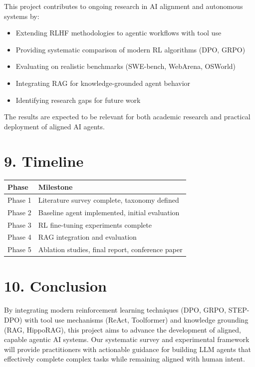 \documentclass[12pt,a4paper]{report}
\theoremstyle{definition}
\begin{document}
This project contributes to ongoing research in AI alignment and autonomous systems by:
\begin{itemize}
    \item Extending RLHF methodologies to agentic workflows with tool use
    \item Providing systematic comparison of modern RL algorithms (DPO, GRPO)
    \item Evaluating on realistic benchmarks (SWE-bench, WebArena, OSWorld)
    \item Integrating RAG for knowledge-grounded agent behavior
    \item Identifying research gaps for future work
\end{itemize}

The results are expected to be relevant for both academic research and practical deployment of aligned AI agents.

\section*{9. Timeline}

\begin{table}[h]
\centering
\begin{tabular}{@{}ll@{}}
\toprule
\textbf{Phase} & \textbf{Milestone} \\
\midrule
Phase 1 & Literature survey complete, taxonomy defined \\
Phase 2 & Baseline agent implemented, initial evaluation \\
Phase 3 & RL fine-tuning experiments complete \\
Phase 4 & RAG integration and evaluation \\
Phase 5 & Ablation studies, final report, conference paper \\
\bottomrule
\end{tabular}
\end{table}

\section*{10. Conclusion}

By integrating modern reinforcement learning techniques (DPO, GRPO, STEP-DPO) with tool use mechanisms (ReAct, Toolformer) and knowledge grounding (RAG, HippoRAG), this project aims to advance the development of aligned, capable agentic AI systems. Our systematic survey and experimental framework will provide practitioners with actionable guidance for building LLM agents that effectively complete complex tasks while remaining aligned with human intent.
\end{document}
